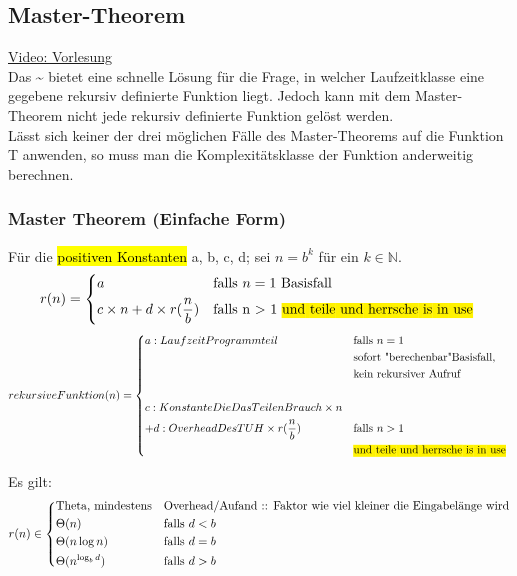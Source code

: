 \documentclass[a4paper]{scrartcl}
\begin{document}
	\subsection{Master-Theorem}
	\href{https://www.youtube.com/watch?v=GEhb2lrcJCk&t=2985s}{Video: Vorlesung }\\
	Das \~{} bietet eine schnelle Lösung für die Frage, in welcher Laufzeitklasse eine gegebene rekursiv definierte Funktion liegt. Jedoch kann mit dem Master-Theorem nicht jede rekursiv definierte Funktion gelöst werden. \\
	
	Lässt sich keiner der drei möglichen Fälle des Master-Theorems auf die Funktion T anwenden, so muss man die Komplexitätsklasse der Funktion anderweitig berechnen.
		\subsubsection{Master Theorem (Einfache Form)}
		Für die \hl{positiven Konstanten} a, b, c, d; sei \( n =b^k \) für ein \( k \in \mathbb{N} \).
		\begin{align*}
			r(n) =
			\begin{dcases*}
				a & falls \(n = 1\) Basisfall\\
				c \times n + d \times r (\frac{n}{b}) & falls n > 1 \hl{und teile und herrsche is in use}
			\end{dcases*}
		\end{align*}
		\begin{align*}
			rekursiveFunktion(n) =
				\begin{dcases*}
					a:LaufzeitProgrammteil & falls \(n = 1\)\\ 
					&sofort "berechenbar"Basisfall,\\
					&kein rekursiver Aufruf\\
					\\
					c:KonstanteDieDasTeilenBrauch \times n \\
					+ d:OverheadDesTUH  \times r (\frac{n}{b}) &falls  \(n > 1\)\\
					&\hl{und teile und herrsche is in use}
				\end{dcases*}
		\end{align*}
		
		Es gilt:
		\begin{align*}
		r(n) \in 
			\begin{dcases*}
				\text{Theta, mindestens} & Overhead/Aufand :: Faktor wie viel kleiner die Eingabelänge wird\\
				\Theta(n) & falls \(d < b\)\\
				\Theta(n \log n) & falls \(d = b\)\\
				\Theta(n^{\log_b d}) & falls \(d > b\)\\
			\end{dcases*}
		\end{align*}
		
\end{document}
